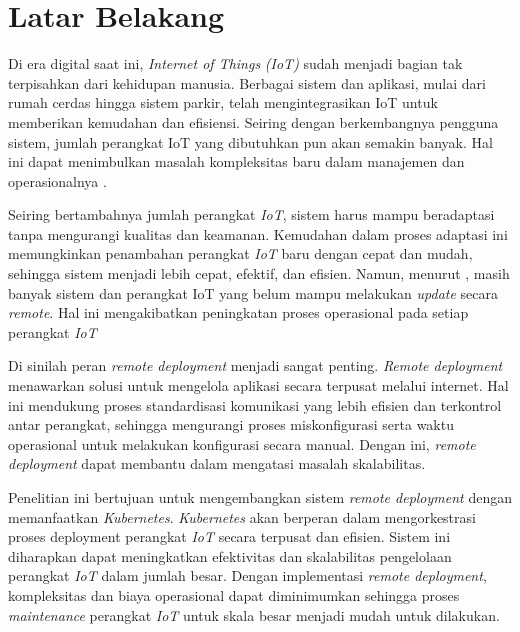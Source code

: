 \section{Latar Belakang}

Di era digital saat ini, \textit{Internet of Things} \textit{(IoT)} sudah menjadi bagian tak terpisahkan dari kehidupan manusia. Berbagai sistem dan aplikasi, mulai dari rumah cerdas hingga sistem parkir, telah mengintegrasikan IoT untuk memberikan kemudahan dan efisiensi. Seiring dengan berkembangnya pengguna sistem, jumlah perangkat IoT yang dibutuhkan pun akan semakin banyak. Hal ini dapat menimbulkan masalah kompleksitas baru dalam manajemen dan operasionalnya \parencite{IOTSmartCity}.

Seiring bertambahnya jumlah perangkat \textit{IoT}, sistem harus mampu beradaptasi tanpa mengurangi kualitas dan keamanan. Kemudahan dalam proses adaptasi ini memungkinkan penambahan perangkat \textit{IoT} baru dengan cepat dan mudah, sehingga sistem menjadi lebih cepat, efektif, dan efisien. Namun, menurut \parencite{RemoteDeployment}, masih banyak sistem dan perangkat IoT yang belum mampu melakukan \textit{update} secara \textit{remote}. Hal ini mengakibatkan peningkatan proses operasional pada setiap perangkat \textit{IoT}

Di sinilah peran \textit{remote deployment} menjadi sangat penting. \textit{Remote deployment} menawarkan solusi untuk mengelola aplikasi secara terpusat melalui internet. Hal ini mendukung proses standardisasi komunikasi yang lebih efisien dan terkontrol antar perangkat, sehingga mengurangi proses miskonfigurasi serta waktu operasional untuk melakukan konfigurasi secara manual. Dengan ini, \textit{remote deployment} dapat membantu dalam mengatasi masalah skalabilitas.

Penelitian ini bertujuan untuk mengembangkan sistem \textit{remote deployment} dengan memanfaatkan \textit{Kubernetes}. \textit{Kubernetes} akan berperan dalam mengorkestrasi proses deployment perangkat \textit{IoT} secara terpusat dan efisien. Sistem ini diharapkan dapat meningkatkan efektivitas dan skalabilitas pengelolaan perangkat \textit{IoT} dalam jumlah besar. Dengan implementasi \textit{remote deployment}, kompleksitas dan biaya operasional dapat diminimumkan sehingga proses \textit{maintenance} perangkat \textit{IoT} untuk skala besar menjadi mudah untuk dilakukan.